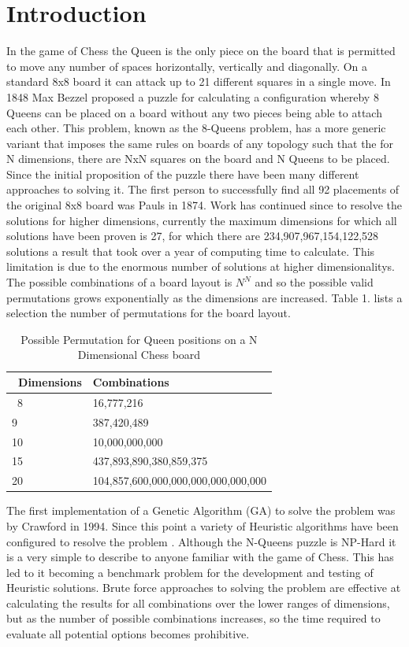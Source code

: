 \documentclass[a4paper,onecolumn,11pt]{article}
\begin{document}
\section{Introduction}
In the game of Chess the Queen is the only piece on the board that is permitted to move any number of spaces horizontally, vertically and diagonally. On a standard 8x8 board it can attack up to 21 different squares in a single move. In 1848 Max Bezzel proposed a puzzle for calculating a configuration whereby 8 Queens can be placed on a board without any two pieces being able to attach each other. This problem, known as the 8-Queens problem, has a more generic variant that imposes the same rules on boards of any topology such that the for N dimensions, there are NxN squares on the board and N Queens to be placed. Since the initial proposition of the puzzle there have been many different approaches to solving it. The first person to successfully find all 92 placements of the original 8x8 board was Pauls \cite{Pauls} in 1874. Work has continued since to resolve the solutions for higher dimensions, currently the maximum dimensions for which all solutions have been proven is 27, for which there are 234,907,967,154,122,528 solutions a result that took over a year of computing time to calculate\cite{27Queens}. This limitation is due to the enormous number of solutions at higher dimensionalitys. The possible combinations of a board layout is $N^{N}$ and so the possible valid permutations grows exponentially as the dimensions are increased. Table 1. lists a selection the number of permutations for the board layout.

\begin{table}[!htbp]
	\begin{tabular}{|l |l|} 
		\hline\
		Dimensions & Combinations \\
		\hline\
		8 & 16,777,216 \\ 
		9 & 387,420,489 \\
		10 & 10,000,000,000 \\
		15 & 437,893,890,380,859,375 \\
		20 & 104,857,600,000,000,000,000,000,000\\
	\hline
	\end{tabular}
	\caption{Possible Permutation for Queen positions on a N Dimensional Chess board} 
\end{table}

The first implementation of a Genetic Algorithm (GA) to solve the problem was by Crawford \cite{Crawford} in 1994. Since this point a variety of Heuristic algorithms have been configured to resolve the problem \cite{AdvanceMutation} \cite{ACO} \cite{comparison} \cite{PSO}. Although the N-Queens puzzle is NP-Hard it is a very simple to describe to anyone familiar with the game of Chess. This has led to it becoming a benchmark problem for the development and testing of Heuristic solutions. Brute force approaches to solving the problem are effective at calculating the results for all combinations over the lower ranges of dimensions, but as the number of possible combinations increases, so the time required to evaluate all potential options becomes prohibitive.
\end{document}
